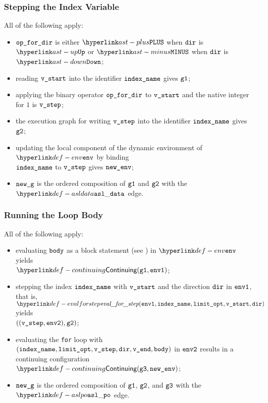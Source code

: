 \ProseParagraph
\subsubsection{Stepping the Index Variable}
All of the following apply:
\begin{itemize}
  \item $\texttt{op\_for\_dir}$ is either $\PLUS$ when $\texttt{dir}$ is $\UP$ or $\MINUS$ when $\texttt{dir}$ is $\DOWN$;
  \item reading $\texttt{v\_start}$ into the identifier $\texttt{index\_name}$ gives $\texttt{g1}$;
  \item applying the binary operator $\texttt{op\_for\_dir}$ to $\texttt{v\_start}$ and the native integer for $1$ is $\texttt{v\_step}$;
  \item the execution graph for writing $\texttt{v\_step}$ into the identifier $\texttt{index\_name}$ gives $\texttt{g2}$;
  \item updating the local component of the dynamic environment of $\env$ by binding \\ $\texttt{index\_name}$ to $\texttt{v\_step}$
  gives $\texttt{new\_env}$;
  \item $\texttt{new\_g}$ is the ordered composition of $\texttt{g1}$ and $\texttt{g2}$ with the $\asldata$ edge.
\end{itemize}

\subsubsection{Running the Loop Body}
All of the following apply:
\begin{itemize}
  \item evaluating $\texttt{body}$ as a block statement (see ) in $\env$
        yields \\ $\Continuing(\vgone, \envone)$\ProseTerminateAs{\ReturningConfig, \ThrowingConfig, \DynErrorConfig};
  \item stepping the index $\texttt{index\_name}$ with $\texttt{v\_start}$ and the direction $\texttt{dir}$ in $\texttt{env1}$,
        that is, $\evalforstep(\envone, \vindexname, \vlimitopt, \vstart, \dir)$ yields \\
        $((\texttt{v\_step}, \texttt{env2}), \texttt{g2})$;
  \item evaluating the \texttt{for} loop with $(\texttt{index\_name}, \texttt{limit\_opt}, \texttt{v\_step}, \texttt{dir}, \texttt{v\_end}, \texttt{body})$
        in $\texttt{env2}$ results in a continuing configuration $\Continuing(\vgthree, \newenv)$\ProseTerminateAs{\ReturningConfig, \ThrowingConfig, \DynErrorConfig};
  \item $\texttt{new\_g}$ is the ordered composition of $\texttt{g1}$, $\texttt{g2}$, and $\texttt{g3}$ with the $\aslpo$
        edge.
\end{itemize}

